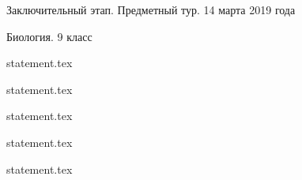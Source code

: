 \documentclass[a4paper,11pt, oneside]{book}
\begin{document}
\vspace{-3mm}
\vspace{-5mm}

\normalsize

\begin{center}
    Заключительный этап. Предметный тур. 14 марта 2019 года
    
    Биология. 9 класс
\end{center}

\parindent=0cm

{statement.tex}

{statement.tex}

\newpage

{statement.tex}

{statement.tex}

{statement.tex}
\end{document}
